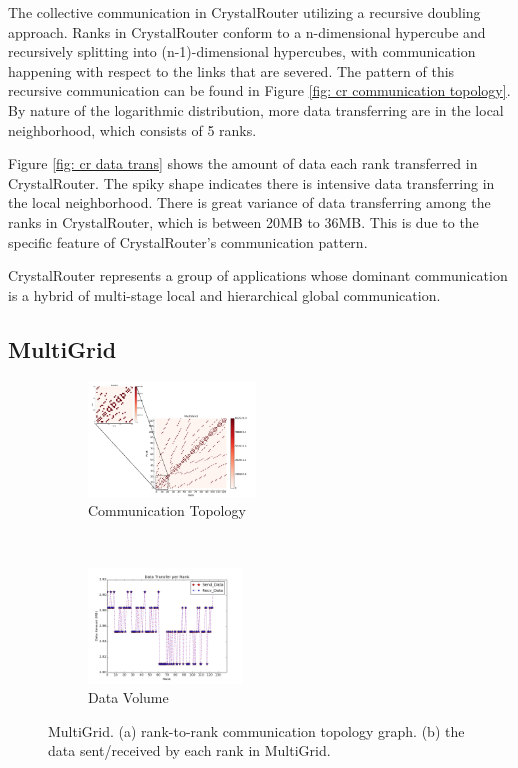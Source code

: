 \documentclass[conference]{IEEEtran}
\begin{document}
The collective communication in CrystalRouter utilizing a recursive doubling approach. Ranks in CrystalRouter conform to a n-dimensional hypercube and recursively splitting into (n-1)-dimensional hypercubes, with communication happening with respect to the links that are severed. The pattern of this recursive communication can be found in Figure \ref{fig: cr communication topology}. By nature of the logarithmic distribution, more data transferring are in the local neighborhood, which consists of 5 ranks.

Figure \ref{fig: cr data trans} shows the amount of data each rank transferred in CrystalRouter. The spiky shape indicates there is intensive data transferring in the local neighborhood. There is great variance of data transferring among the ranks in CrystalRouter, which is between 20MB to 36MB. This is due to the specific feature of CrystalRouter's communication pattern.

CrystalRouter represents a group of applications whose dominant communication is a hybrid of multi-stage local and hierarchical global communication.

\subsection{MultiGrid}
\label{sec:multigrid}

\begin{figure}[t!]
    \centering
    \begin{subfigure}[t]{0.22\textwidth}
        \centering
        \includegraphics[height=1.2in]{figs/appstudy/mg/mg_pip}
        \caption{Communication Topology}
        \label{fig: mg communication topology}
    \end{subfigure}
    ~
    \begin{subfigure}[t]{0.22\textwidth}
        \centering
        \includegraphics[height=1.2in]{figs/appstudy/mg/mg_data_transfer}
        \caption{Data Volume}
        \label{fig: mg data trans}
    \end{subfigure}
    \caption{MultiGrid. (a) rank-to-rank communication topology graph. (b) the data sent/received by each rank in MultiGrid.}
\end{figure}
\end{document}
